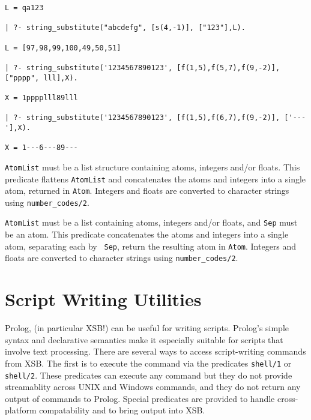 \begin{description}
\begin{verbatim}
L = qa123

| ?- string_substitute("abcdefg", [s(4,-1)], ["123"],L).

L = [97,98,99,100,49,50,51]

| ?- string_substitute('1234567890123', [f(1,5),f(5,7),f(9,-2)], ["pppp", lll],X).

X = 1pppplll89lll

| ?- string_substitute('1234567890123', [f(1,5),f(6,7),f(9,-2)], ['---'],X).

X = 1---6---89---
\end{verbatim}


{\tt AtomList} must be a list structure containing atoms, integers
and/or floats.  This predicate flattens {\tt AtomList} and
concatenates the atoms and integers into a single atom, returned in
{\tt Atom}.  Integers and floats are converted to character strings
using {\tt number\_codes/2}.


{\tt AtomList} must be a list containing atoms, integers and/or
floats, and {\tt Sep} must be an atom.  This predicate concatenates
the atoms and integers into a single atom, separating each by {\tt
Sep}, return the resulting atom in {\tt Atom}.  Integers and floats
are converted to character strings using {\tt number\_codes/2}.
\end{description}


\section{Script Writing Utilities}

Prolog, (in particular XSB!) can be useful for writing scripts.
Prolog's simple syntax and declarative semantics make it especially
suitable for scripts that involve text processing.  There are several
ways to access script-writing commands from XSB.  The first is to
execute the command via the predicates {\tt shell/1} or {\tt shell/2}.
These predicates can execute any command but they do not provide
streamablity across UNIX and Windows commands, and they do not return
any output of commands to Prolog.  Special predicates are provided to
handle cross-platform compatability and to bring output into XSB.

